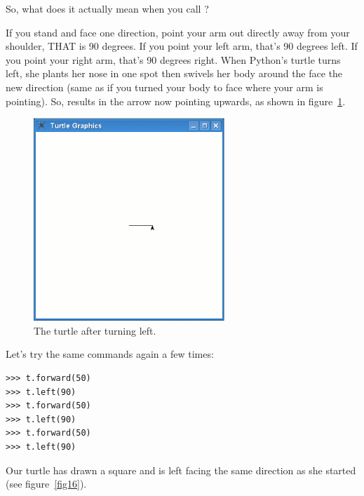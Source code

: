 So, what does it actually mean when you call ?
\par
If you stand and face one direction, point your arm out directly away from your shoulder, THAT is 90 degrees.  If you point your left arm, that's 90 degrees left.  If you point your right arm, that's 90 degrees right.  When Python's turtle turns left, she plants her nose in one spot then swivels her body around the face the new direction (same as if you turned your body to face where your arm is pointing).  So,  results in the arrow now pointing upwards, as shown in figure~\ref{fig15}.

\begin{figure}
\begin{center}
\includegraphics[width=72mm]{figure15.eps}
\end{center}
\caption{The turtle after turning left.}\label{fig15}
\end{figure}

Let's try the same commands again a few times:

\begin{listing}
\begin{verbatim}
>>> t.forward(50)
>>> t.left(90)
>>> t.forward(50)
>>> t.left(90)
>>> t.forward(50)
>>> t.left(90)
\end{verbatim}
\end{listing}

Our turtle has drawn a square and is left facing the same direction as she started (see figure~\ref{fig16}).

